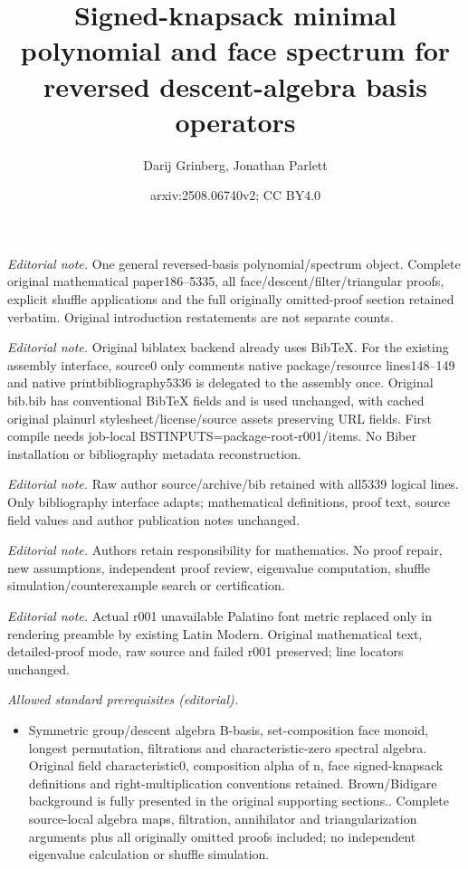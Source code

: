 \documentclass[12pt]{article}
\title{Signed-knapsack minimal polynomial and face spectrum for reversed descent-algebra basis operators}
\author{Darij Grinberg, Jonathan Parlett}
\date{arxiv:2508.06740v2; CC BY4.0}
\theoremstyle{definition}%
\theoremstyle{definition}%
\theoremstyle{remark}%
\begin{document}
\maketitle
\noindent\textit{Editorial note.} One general reversed-basis polynomial/spectrum object. Complete original mathematical paper186--5335, all face/descent/filter/triangular proofs, explicit shuffle applications and the full originally omitted-proof section retained verbatim. Original introduction restatements are not separate counts.\par\medskip
\noindent\textit{Editorial note.} Original biblatex backend already uses BibTeX. For the existing assembly interface, source0 only comments native package/resource lines148--149 and native printbibliography5336 is delegated to the assembly once. Original bib.bib has conventional BibTeX fields and is used unchanged, with cached original plainurl stylesheet/license/source assets preserving URL fields. First compile needs job-local BSTINPUTS=package-root-r001/items. No Biber installation or bibliography metadata reconstruction.\par\medskip
\noindent\textit{Editorial note.} Raw author source/archive/bib retained with all5339 logical lines. Only bibliography interface adapts; mathematical definitions, proof text, source field values and author publication notes unchanged.\par\medskip
\noindent\textit{Editorial note.} Authors retain responsibility for mathematics. No proof repair, new assumptions, independent proof review, eigenvalue computation, shuffle simulation/counterexample search or certification.\par\medskip
\noindent\textit{Editorial note.} Actual r001 unavailable Palatino font metric replaced only in rendering preamble by existing Latin Modern. Original mathematical text, detailed-proof mode, raw source and failed r001 preserved; line locators unchanged.\par\medskip
\noindent\textit{Allowed standard prerequisites (editorial).}\begin{itemize}
\item Symmetric group/descent algebra B-basis, set-composition face monoid, longest permutation, filtrations and characteristic-zero spectral algebra. Original field characteristic0, composition alpha of n, face signed-knapsack definitions and right-multiplication conventions retained. Brown/Bidigare background is fully presented in the original supporting sections.. Complete source-local algebra maps, filtration, annihilator and triangularization arguments plus all originally omitted proofs included; no independent eigenvalue calculation or shuffle simulation.
\end{itemize}\medskip
\end{document}
